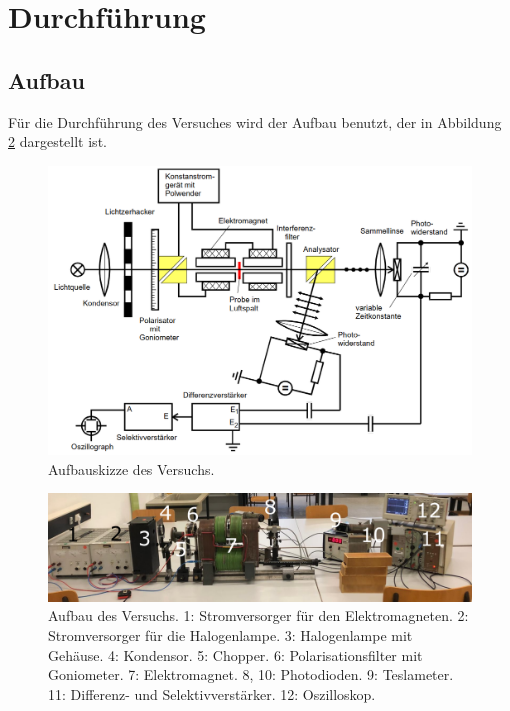 \section{Durchführung}
\label{sec:Durchführung}

\subsection{Aufbau}

Für die Durchführung des Versuches wird der Aufbau benutzt, der in Abbildung \ref{fig:aufbau}
dargestellt ist. 

\begin{figure}[H]
    \centering
    \includegraphics[width=\textwidth]{Bilder/aufbau.png}
    \caption{Aufbauskizze des Versuchs. \cite{faradayeffekt}}
    \label{fig:aufbau}
\end{figure}

\begin{figure}[H]
    \centering
    \includegraphics[width=\textwidth]{Bilder/image1.png}
    \caption{Aufbau des Versuchs. 1: Stromversorger für den Elektromagneten. 2: Stromversorger für die Halogenlampe. 3: Halogenlampe mit Gehäuse. 4: Kondensor. 5: Chopper. 6: Polarisationsfilter mit Goniometer. 7: Elektromagnet. 8, 10: Photodioden. 9: Teslameter. 11: Differenz- und Selektivverstärker. 12: Oszilloskop.}
    \label{fig:aufbau}
\end{figure}

